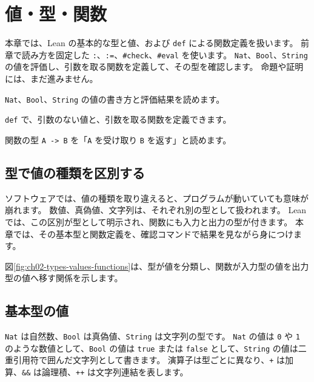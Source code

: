 \chapter{値・型・関数}
\label{chap:ch02_values_types_functions}

\begin{chapterabstract}
本章では、Lean の基本的な型と値、および \texttt{def} による関数定義を扱います。
前章で読み方を固定した \texttt{:}、\texttt{:=}、\texttt{\#check}、\texttt{\#eval} を使います。
\texttt{Nat}、\texttt{Bool}、\texttt{String} の値を評価し、引数を取る関数を定義して、その型を確認します。
命題や証明には、まだ進みません。
\end{chapterabstract}

\begin{learninggoals}
\item \texttt{Nat}、\texttt{Bool}、\texttt{String} の値の書き方と評価結果を読めます。
\item \texttt{def} で、引数のない値と、引数を取る関数を定義できます。
\item 関数の型 \texttt{A -> B} を「\texttt{A} を受け取り \texttt{B} を返す」と読めます。
\end{learninggoals}

\section{型で値の種類を区別する}

ソフトウェアでは、値の種類を取り違えると、プログラムが動いていても意味が崩れます。
数値、真偽値、文字列は、それぞれ別の型として扱われます。
Lean では、この区別が型として明示され、関数にも入力と出力の型が付きます。
本章では、その基本型と関数定義を、確認コマンドで結果を見ながら身につけます。

図\ref{fig:ch02-types-values-functions}は、型が値を分類し、関数が入力型の値を出力型の値へ移す関係を示します。


\section{基本型の値}

\texttt{Nat} は自然数、\texttt{Bool} は真偽値、\texttt{String} は文字列の型です。
\texttt{Nat} の値は \texttt{0} や \texttt{1} のような数値として、\texttt{Bool} の値は \texttt{true} または \texttt{false} として、\texttt{String} の値は二重引用符で囲んだ文字列として書きます。
演算子は型ごとに異なり、\texttt{+} は加算、\texttt{\&\&} は論理積、\texttt{++} は文字列連結を表します。


